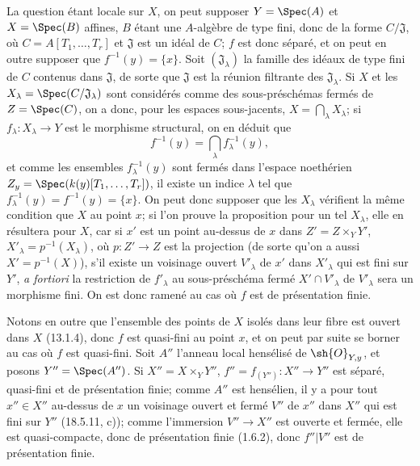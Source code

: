 La question étant locale sur $X$, on peut supposer $Y=\Spec(A)$ et $X=\Spec(B)$ affines, $B$ étant une $A$-algèbre de type fini, donc de la forme $C/\mathfrak J$, où $C=A[T_1,\ldots,T_r]$ et $\mathfrak J$ est un idéal de $C$; $f$ est donc séparé, et on peut en outre supposer que $f^{-1}(y)=\{x\}$. Soit $(\mathfrak J_\lambda)$ la famille des idéaux de type fini de $C$ contenus dans $\mathfrak J$, de sorte que $\mathfrak J$ est la réunion filtrante des $\mathfrak J_\lambda$. Si $X$ et les $X_\lambda=\Spec(C/\mathfrak J_\lambda)$ sont considérés comme des sous-préschémas fermés de $Z=\Spec(C)$, on a donc, pour les espaces sous-jacents, $X=\bigcap_\lambda X_\lambda$; si $f_\lambda:X_\lambda\to Y$ est le morphisme structural, on en déduit que
\[
  f^{-1}(y)=\bigcap_\lambda f_\lambda^{-1}(y),
\]
et comme les ensembles $f_\lambda^{-1}(y)$ sont fermés dans l'espace noethérien $Z_y=\Spec(k(y)[T_1,\ldots,T_r])$, il existe un indice $\lambda$ tel que $f_\lambda^{-1}(y)=f^{-1}(y)=\{x\}$. On peut donc supposer que les $X_\lambda$ vérifient la même condition que $X$ au point $x$; si l'on prouve la proposition pour un tel $X_\lambda$, elle en résultera pour $X$, car si $x'$ est un point au-dessus de $x$ dans $Z'=Z\times_Y Y'$, $X'_\lambda=p^{-1}(X_\lambda)$, où $p:Z'\to Z$ est la projection (de sorte qu'on a aussi $X'=p^{-1}(X)$), s'il existe un voisinage ouvert $V'_\lambda$ de $x'$ dans $X'_\lambda$ qui est fini sur $Y'$, \emph{a fortiori} la restriction de $f'_\lambda$ au sous-préschéma fermé $X'\cap V'_\lambda$ de $V'_\lambda$ sera un morphisme fini. On est donc ramené au cas où $f$ est de présentation finie.

Notons en outre que l'ensemble des points de $X$ isolés dans leur fibre est ouvert dans $X$ (13.1.4), donc $f$ est quasi-fini au point $x$, et on peut par suite se borner au cas où $f$ est quasi-fini. Soit $A''$ l'anneau local hensélisé de $\sh{O}_{Y,y}$, et posons $Y''=\Spec(A'')$. Si $X''=X\times_Y Y''$, $f''=f_{(Y'')}:X''\to Y''$ est séparé, quasi-fini et de présentation finie; comme $A''$ est hensélien, il y a pour tout $x''\in X''$ au-dessus de $x$ un voisinage ouvert et fermé $V''$ de $x''$ dans $X''$ qui est fini sur $Y''$ (18.5.11, c)); comme l'immersion $V''\to X''$ est ouverte et fermée, elle est quasi-compacte, donc de présentation finie (1.6.2), donc $f''|V''$ est de présentation finie.


